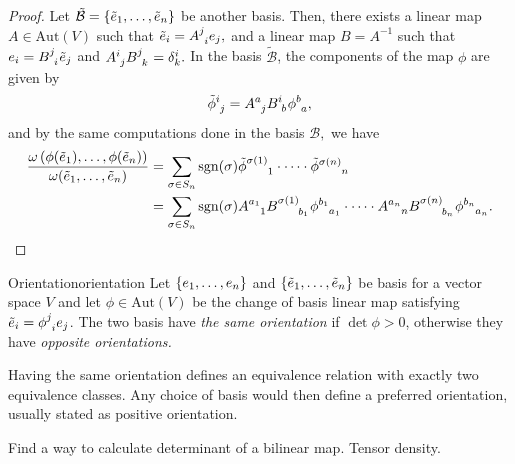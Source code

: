 \begin{proof}
    Let \(\tilde{\mathcal{B}} = \{\tilde{e}_1, \dots, \tilde{e}_n\}\) be another basis. Then, there exists a linear map \(A \in \mathrm{Aut}(V)\) such that \(\tilde{e}_i = A\indices{^j_i}e_j,\) and a linear map \(B = A^{-1}\) such that \(e_i = B\indices{^j_i}\tilde{e}_j\) and \(A\indices{^i_j}B\indices{^j_k} = \delta^i_k.\) In the basis \(\tilde{\mathcal{B}}\), the components of the map \(\phi\) are given by
    \begin{equation*}
        \tilde{\phi}\indices{^i_j} = A\indices{^a_j}B\indices{^i_b}\phi\indices{^b_a},
    \end{equation*}
    and by the same computations done in the basis \(\mathcal{B},\) we have
    \begin{align*}
        \frac{\omega\left(\phi(\tilde{e}_1), \dots, \phi(\tilde{e}_n)\right)}{\omega(\tilde{e}_1, \dots, \tilde{e}_n)} &= \sum_{\sigma \in S_n} \sgn(\sigma) \tilde{\phi}\indices{^{\sigma(1)}_{1}} \cdot \dots \cdot \tilde{\phi}\indices{^{\sigma(n)}_{n}}\\
                                                                                                                               &= \sum_{\sigma \in S_n} \sgn(\sigma) A\indices{^{a_1}_1}B\indices{^{\sigma(1)}_{b_1}}\phi\indices{^{b_1}_{a_1}}
                                                                                                                           \cdot \dots \cdot A\indices{^{a_n}_n}B\indices{^{\sigma(n)}_{b_n}}\phi\indices{^{b_n}_{a_n}}.
    \end{align*}
    \todo
\end{proof}

\begin{definition}{Orientation}{orientation}
    Let \(\{e_1, \dots, e_n\}\) and \(\{\tilde{e}_1, \dots, \tilde{e}_n\}\) be basis for a vector space \(V\) and let \(\phi \in \mathrm{Aut}(V)\) be the change of basis linear map satisfying \(\tilde{e}_i = \phi\indices{^j_i}e_j\). The two basis have \emph{the same orientation} if \(\det \phi > 0\), otherwise they have \emph{opposite orientations.}
\end{definition}
\begin{remark}
    Having the same orientation defines an equivalence relation with exactly two equivalence classes. Any choice of basis would then define a preferred orientation, usually stated as positive orientation.
\end{remark}

Find a way to calculate determinant of a bilinear map. Tensor density.


